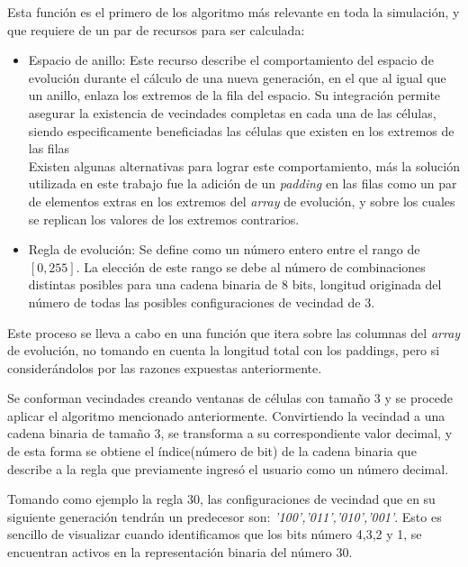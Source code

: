 \documentclass[]{article}
\begin{document}
				\hfill\break
				\justifying
				Esta función es el primero de los algoritmo más relevante en toda la simulación, y que requiere de un par de recursos para ser calculada:
				\begin{itemize}
					\item Espacio de anillo: Este recurso describe el comportamiento del espacio de evolución durante el cálculo de una nueva generación, en el que al igual que un anillo, enlaza los extremos de la fila del espacio. Su integración permite asegurar la existencia de vecindades completas en cada una de las células, siendo especificamente beneficiadas las células que existen en los extremos de las filas\\ Existen algunas alternativas para lograr este comportamiento, más la solución utilizada en este trabajo fue la adición de un \textit{padding} en las filas como un par de elementos extras en los extremos del \textit{array} de evolución, y sobre los cuales se replican los valores de los extremos contrarios.
					
					\item Regla de evolución: Se define como un número entero entre el rango de $[0,255]$. La elección de este rango se debe al número de combinaciones distintas posibles para una cadena binaria de 8 bits, longitud originada del número de todas las posibles configuraciones de vecindad de 3.
				\end{itemize}
				
				\hfill\break
				\justifying
				Este proceso se lleva a cabo en una función que itera sobre las columnas del \textit{array} de evolución, no tomando en cuenta la longitud total con los paddings, pero si considerándolos por las razones expuestas anteriormente.
				
				\hfill\break
				\justifying
				Se conforman vecindades creando ventanas de células con tamaño 3 y se procede aplicar el algoritmo mencionado anteriormente. Convirtiendo la vecindad a una cadena binaria de tamaño 3, se transforma a su correspondiente valor decimal, y de esta forma se obtiene el índice(número de bit) de la cadena binaria que describe a la regla que previamente ingresó el usuario como un número decimal.
				
				\hfill\break
				\justifying
				Tomando como ejemplo la regla 30, las configuraciones de vecindad que en su siguiente generación tendrán un predecesor son: \textit{'100','011','010','001'}. Esto es sencillo de visualizar cuando identificamos que los bits número 4,3,2 y 1, se encuentran activos en la representación binaria del número 30.
				
\end{document}
